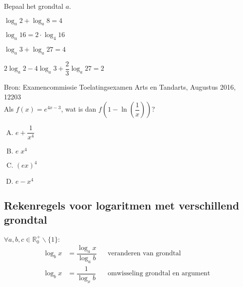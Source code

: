 \documentclass[12pt,twoside,a4paper]{article}
\begin{document}
\begin{oefening} %
Bepaal het grondtal $a$.
\begin{exlist}{2}
  \item $\log_a 2 + \log_a 8 = 4$
  \item $\log_a 16 = 2\cdot \log_4 16$
  \item $\log_a 3 + \log_a 27 = 4$
  \item $2 \log_a 2 - 4 \log_a 3 + \dfrac{2}{3}\log_a 27 = 2$
\end{exlist}
\end{oefening}

\begin{oefening}{\scriptsize Bron: Examencommissie Toelatingsexamen Arts en Tandarts, Augustus 2016, 12203}\\
Als $\displaystyle f(x)=e^{4x-3}$, wat is dan $\displaystyle f\left(1-\ln\left(\dfrac{1}{x}\right)\right)$?
\begin{enumerate}[(A)]
  \itemsep1em
  \item $e+\dfrac{1}{x^4}$
  \item $e\;x^4$
  \item $(ex)^4$
  \item $e-x^4$
\end{enumerate}
\end{oefening}

\subsection{Rekenregels voor logaritmen met verschillend grondtal}

\begin{mdframed}
$\forall a,b,c \in \mathbb{R}_0^+\backslash\{1\}:$
\begin{align*}
\log_b x &= \dfrac{\log_a x}{\log_a b} && \mbox{veranderen van grondtal}\\
\log_b x &= \dfrac{1}{\log_x b} && \mbox{omwisseling grondtal en argument}
\end{align*}
\end{mdframed}
\end{document}
